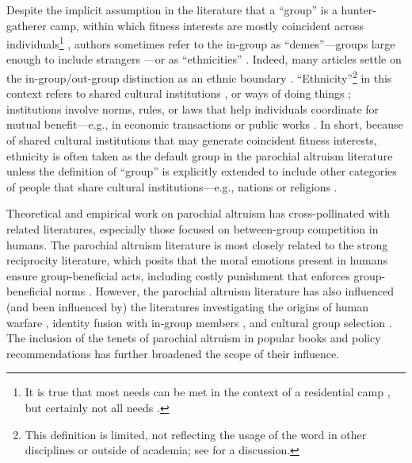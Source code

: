 \documentclass[bibauthoryear]{aa}
\begin{document}
 Despite the implicit assumption in the literature that a ``group'' is a hunter-gatherer camp, within which fitness interests are mostly coincident across individuals\footnote{It is true that most needs can be met in the context of a residential camp \citep[e.g.,][]{fafchamps2007formation}, but certainly not all needs \citep{hill2014hunter, layton2012antiquity}.} %
 \citep{bowles2003origins}, authors sometimes refer to the in-group as ``demes''---groups large enough to include strangers \citep[see][for a discussion]{brewer2006evolutionary}---or as ``ethnicities'' \citep{choi2007coevolution}. Indeed, many articles settle on the in-group/out-group distinction as an ethnic boundary \citep{mcelreath2003shared}. ``Ethnicity''\footnote{This definition is limited, not reflecting the usage of the word in other disciplines or outside of academia; see \citet{jenkins1994rethinking} for a discussion.} in this context refers to shared cultural institutions \citep{barth1956ecologic, barth1998ethnic}, or ways of doing things \citep{north1991}; institutions involve norms, rules, or laws that help individuals coordinate for mutual benefit---e.g., in economic transactions or public works \citep{glowacki2020}. In short, because of shared cultural institutions that may generate coincident fitness interests, ethnicity is often taken as the default group in the parochial altruism literature unless the definition of ``group'' is explicitly extended to include other categories of people that share cultural institutions---e.g., nations \citep{greene2013moral} or religions \citep{purzycki2016moralistic}.
	
Theoretical and empirical work on parochial altruism has cross-pollinated with related literatures, especially those focused on between-group competition in humans. The parochial altruism literature is most closely related to the strong reciprocity literature, which posits that the moral emotions present in humans ensure group-beneficial acts, including costly punishment that enforces group-beneficial norms \citep{fehr2002strong, fehr2003strong, gintis2008strong}. However, the parochial altruism literature has also influenced (and been influenced by) the literatures investigating the origins of human warfare \citep{glowacki2017evolutionary, wrangham2012intergroup, zefferman2015evolutionary}, identity fusion with in-group members \citep{swann2012group,  purzycki2019identity}, and cultural group selection \citep{richerson2016cultural}. The inclusion of the tenets of parochial altruism in popular books \citep{seabright2004company, greene2013moral} and policy recommendations \citep{choi2019parochialism, waring2015} has further broadened the scope of their influence.
\end{document}
